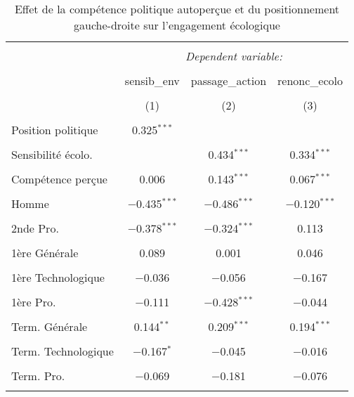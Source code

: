 
\begin{table}[!htbp] \centering 
  \caption{Effet de la compétence politique autoperçue et du positionnement gauche-droite sur l'engagement écologique} 
  \label{} 
\begin{tabular}{@{\extracolsep{5pt}}lccc} 
\\[-1.8ex]\hline 
\hline \\[-1.8ex] 
 & \multicolumn{3}{c}{\textit{Dependent variable:}} \\ 
\cline{2-4} 
\\[-1.8ex] & sensib\_env & passage\_action & renonc\_ecolo \\ 
\\[-1.8ex] & (1) & (2) & (3)\\ 
\hline \\[-1.8ex] 
 Position politique & 0.325$^{***}$ &  &  \\ 
  & & & \\ 
 Sensibilité écolo. &  & 0.434$^{***}$ & 0.334$^{***}$ \\ 
  & & & \\ 
 Compétence perçue & 0.006 & 0.143$^{***}$ & 0.067$^{***}$ \\ 
  & & & \\ 
 Homme & $-$0.435$^{***}$ & $-$0.486$^{***}$ & $-$0.120$^{***}$ \\ 
  & & & \\ 
 2nde Pro. & $-$0.378$^{***}$ & $-$0.324$^{***}$ & 0.113 \\ 
  & & & \\ 
 1ère Générale & 0.089 & 0.001 & 0.046 \\ 
  & & & \\ 
 1ère Technologique & $-$0.036 & $-$0.056 & $-$0.167 \\ 
  & & & \\ 
 1ère Pro. & $-$0.111 & $-$0.428$^{***}$ & $-$0.044 \\ 
  & & & \\ 
 Term. Générale & 0.144$^{**}$ & 0.209$^{***}$ & 0.194$^{***}$ \\ 
  & & & \\ 
 Term. Technologique & $-$0.167$^{*}$ & $-$0.045 & $-$0.016 \\ 
  & & & \\ 
 Term. Pro. & $-$0.069 & $-$0.181 & $-$0.076 \\ 
  & & & \\ 

\end{tabular}
\end{table}
